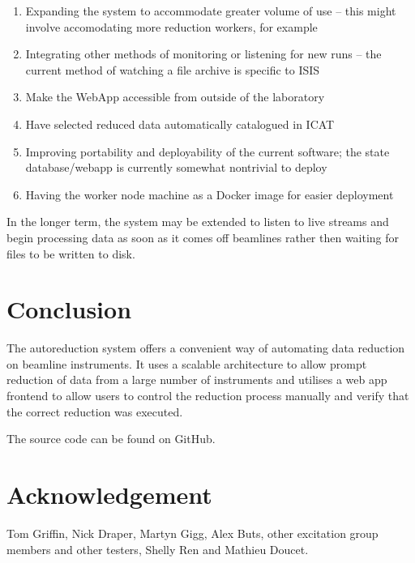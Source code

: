 \documentclass[twocolumn]{article}
\begin{document}
\begin{enumerate}
\item
  Expanding the system to accommodate greater volume of use -- this
  might involve accomodating more reduction workers, for example
\item
  Integrating other methods of monitoring or listening for new runs -- the current
  method of watching a file archive is specific to ISIS
\item
  Make the WebApp accessible from outside of the laboratory
\item
  Have selected reduced data automatically catalogued in ICAT 
\item
  Improving portability and deployability of the current software; the
  state database/webapp is currently somewhat nontrivial to deploy
\item 
  Having the worker node machine as a Docker \cite{docker} image for
  easier deployment
\end{enumerate}

In the longer term, the system may be extended to listen to live streams and begin
processing data as soon as it comes off beamlines rather then waiting for files 
to be written to disk. 

\section{Conclusion}\label{conclusion}

The autoreduction system offers a convenient way of automating data reduction
on beamline instruments. It uses a scalable architecture to allow prompt
reduction of data from a large number of instruments and utilises a web app
frontend to allow users to control the reduction process manually and verify
that the correct reduction was executed.

The source code can be found on GitHub\cite{source}.

\section{Acknowledgement}\label{Acknowledgement}

Tom Griffin, Nick Draper, Martyn Gigg, Alex Buts, other excitation group members and other testers, Shelly Ren and Mathieu Doucet.
\end{document}
